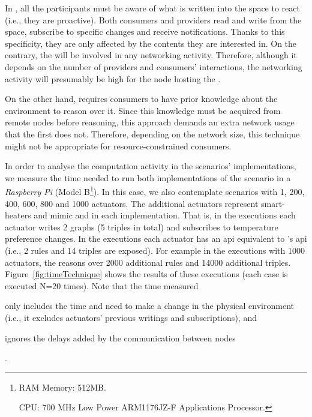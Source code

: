 In \spaceActuation{}, all the participants must be aware of what is written into the space to react (i.e., they are proactive).
Both consumers and providers read and write from the space, subscribe to specific changes and receive notifications.
Thanks to this specificity, they are only affected by the contents they are interested in. %
On the contrary, the \Space{} will be involved in any networking activity.
Therefore, although it depends on the number of providers and consumers' interactions, the networking activity will presumably be high for the node hosting the \Space{}.


On the other hand, \restActuation{} requires consumers to have prior knowledge about the environment to reason over it. %
Since this knowledge must be acquired from remote nodes before reasoning, this approach demands an extra network usage that the first does not.
Therefore, depending on the network size, this technique might not be appropriate for resource-constrained consumers.


\bigskip


In order to analyse the computation activity in the scenarios' implementations, we measure the time needed to run both implementations of the scenario in a \emph{Raspberry Pi} (Model B\footnote{
RAM Memory: 512MB.

CPU: 700 MHz Low Power ARM1176JZ-F Applications Processor.
}).
In this case, we also contemplate scenarios with 1, 200, 400, 600, 800 and 1000 actuators.
The additional actuators represent smart-heaters and mimic \nodeProvSpace{} and \nodeProvRest{} in each implementation.
That is, in the \spaceActuation{} executions each actuator writes 2 graphs (5 triples in total) and subscribes to temperature preference changes.
In the \restActuation{} executions each actuator has an \ac{api} equivalent to \nodeProvRest{}'s \ac{api} (i.e., 2 rules and 14 triples are exposed).
For example in the \nodeProvRest{} executions with 1000 actuators, the \nodeConsRest{} reasons over 2000 additional rules and 14000 additional triples.
Figure~\ref{fig:timeTechnique} shows the results of these executions (each case is executed N=20 times).
Note that the time measured 
\begin{enumerate*}[label=\itshape\bfseries(\arabic*\upshape)]
  \item only includes the time \nodeConsSpace{} and \nodeConsRest{} need to make a change in the physical environment (i.e., it excludes actuators' previous writings and subscriptions), and
  \item ignores the delays added by the communication between nodes %
\end{enumerate*}.


